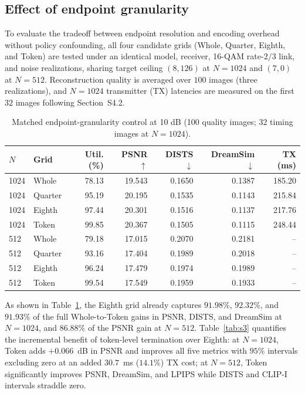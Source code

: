 \documentclass[10pt,letterpaper]{article}
\begin{document}
\subsection{Effect of endpoint granularity}
To evaluate the tradeoff between endpoint resolution and encoding overhead without policy confounding, all four candidate grids (Whole, Quarter, Eighth, and Token) are tested under an identical model, receiver, 16-QAM rate-$2/3$ link, and noise realizations, sharing target ceiling $(8,126)$ at $N=1024$ and $(7,0)$ at $N=512$. Reconstruction quality is averaged over $100$ images (three realizations), and $N=1024$ transmitter (TX) latencies are measured on the first $32$ images following Section~S4.2.

\begin{table}[htbp]
\centering
\caption{Matched endpoint-granularity control at 10 dB (100 quality images; 32 timing images at $N=1024$).}
\label{tab:s2}
\small
\begin{tabular}{@{}llrrrrr@{}}
\toprule
$N$ & Grid & Util. (\%) & PSNR $\uparrow$ & DISTS $\downarrow$ & DreamSim $\downarrow$ & TX (ms)\\
\midrule
1024 & Whole   & 78.13 & 19.543 & 0.1650 & 0.1387 & 185.20\\
1024 & Quarter & 95.19 & 20.195 & 0.1535 & 0.1143 & 215.84\\
1024 & Eighth  & 97.44 & 20.301 & 0.1516 & 0.1137 & 217.76\\
1024 & Token   & 99.85 & 20.367 & 0.1505 & 0.1115 & 248.44\\
\midrule
512  & Whole   & 79.18 & 17.015 & 0.2070 & 0.2181 & --\\
512  & Quarter & 93.16 & 17.404 & 0.1989 & 0.2018 & --\\
512  & Eighth  & 96.24 & 17.479 & 0.1974 & 0.1989 & --\\
512  & Token   & 99.54 & 17.549 & 0.1959 & 0.1933 & --\\
\bottomrule
\end{tabular}
\end{table}

As shown in Table~\ref{tab:s2}, the Eighth grid already captures $91.98\%$, $92.32\%$, and $91.93\%$ of the full Whole-to-Token gains in PSNR, DISTS, and DreamSim at $N=1024$, and $86.88\%$ of the PSNR gain at $N=512$. Table~\ref{tab:s3} quantifies the incremental benefit of token-level termination over Eighth: at $N=1024$, Token adds $+0.066$~dB in PSNR and improves all five metrics with $95\%$ intervals excluding zero at an added $30.7$~ms ($14.1\%$) TX cost; at $N=512$, Token significantly improves PSNR, DreamSim, and LPIPS while DISTS and CLIP-I intervals straddle zero.
\end{document}
